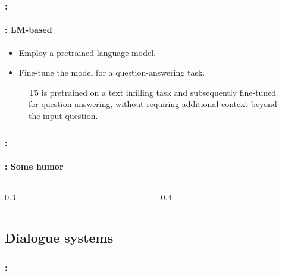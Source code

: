 \documentclass[xcolor=table]{beamer}
\begin{document}
\begin{frame}
	\frametitle{\insertshortsubtitle: \insertsection}
	\framesubtitle{\insertsubsection: LM-based}
	
	\begin{itemize}
		\item Employ a pretrained language model.
		\item Fine-tune the model for a question-answering task.
	\end{itemize}
	
	\begin{figure}
		\centering
		\caption{T5 is pretrained on a text infilling task and subsequently fine-tuned for question-answering, without requiring additional context beyond the input question. \cite{2020-roberts-al}}
	\end{figure}
	
\end{frame}


\begin{frame}
	\frametitle{\insertshortsubtitle: \insertsection}
	\framesubtitle{\insertsubsection: Some humor}
	
	\begin{columns}
		\begin{column}{0.3\textwidth}
			
		\end{column}
		\begin{column}{0.4\textwidth}
		\end{column}
	\end{columns}

\end{frame}

\subsection{Dialogue systems}

\begin{frame}
	\frametitle{\insertshortsubtitle: \insertsection}
	\framesubtitle{\insertsubsection}
	
	
\end{frame}
\end{document}
